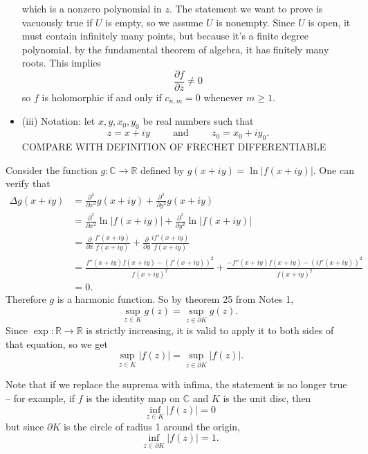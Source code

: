 \documentclass[12pt]{article}
\begin{document}
\begin{itemize}
        which is a nonzero polynomial in $z$. The statement we want to prove is vacuously true if $U$ is empty, so we assume $U$ is nonempty. Since $U$ is open, it must contain infinitely many points, but because it's a finite degree polynomial, by the fundamental theorem of algebra, it has finitely many roots. This implies
        \[ \frac{\partial f}{\partial \overline{z}} \neq 0 \]
        so $f$ is holomorphic if and only if $c_{n,m} = 0$ whenever $m \geq 1$.
    \item (iii) Notation: let $x, y, x_0, y_0$ be real numbers such that
        \[ z=x+iy \hspace{1cm} \text{and} \hspace{1cm} z_0=x_0+iy_0. \]
        COMPARE WITH DEFINITION OF FRECHET DIFFERENTIABLE
\end{itemize}

\noindent{}\bigskip

Consider the function $g: \mathbb{C} \rightarrow \mathbb{R}$ defined by $g(x+iy) = \ln{|f(x+iy)|}$. One can verify that
\begin{align*}
    \Delta g(x+iy) &= \frac{\partial^2}{\partial x^2} g(x+iy) + \frac{\partial^2}{\partial y^2} g(x+iy) \\
                   &= \frac{\partial^2}{\partial x^2} \ln{|f(x+iy)|} + \frac{\partial^2}{\partial y^2} \ln{|f(x+iy)|} \\
                   &= \frac{\partial}{\partial x} \frac{f'(x+iy)}{f(x+iy)} + \frac{\partial}{\partial y} \frac{if'(x+iy)}{f(x+iy)} \\
                   &= \frac{f''(x+iy)f(x+iy)-(f'(x+iy))^2}{f(x+iy)^2} + \frac{-f''(x+iy)f(x+iy)-(if'(x+iy))^2}{f(x+iy)^2} \\
                   &= 0.
\end{align*}
Therefore $g$ is a harmonic function. So by theorem 25 from Notes 1,
\[ \sup_{z \in K} g(z) = \sup_{z \in \partial K} g(z). \]
Since $\exp: \mathbb{R} \rightarrow \mathbb{R}$ is strictly increasing, it is valid to apply it to both sides of that equation, so we get
\[ \sup_{z \in K} |f(z)| = \sup_{z \in \partial K} |f(z)|. \]
\par
Note that if we replace the suprema with infima, the statement is no longer true -- for example, if $f$ is the identity map on $\mathbb{C}$ and $K$ is the unit disc, then
\[ \inf_{z \in K} |f(z)| = 0 \]
but since $\partial K$ is the circle of radius 1 around the origin,
\[ \inf_{z \in \partial K} |f(z)| = 1. \]
\end{document}
